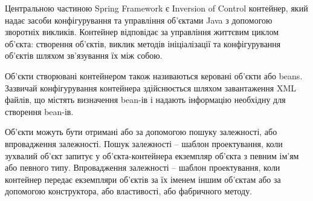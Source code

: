 \par Центральною частиною Spring Framework є Inversion of Control контейнер, який надає засоби конфігурування та управління об'єктами Java з допомогою зворотніх викликів. Контейнер відповідає за управління життєвим циклом об'єкта: створення об'єктів, виклик методів ініціалізації та конфігурування об'єктів шляхом зв'язування їх між собою.
\par Об'єкти створювані контейнером також називаються керовані об'єкти або beans. Зазвичай конфігурування контейнера здійснюється шляхом завантаження XML файлів, що містять визначення bean-ів і надають інформацію необхідну для створення bean-ів.
\par Об'єкти можуть бути отримані або за допомогою пошуку залежності, або впровадження залежності. Пошук залежності -- шаблон проектування, коли зухвалий об'єкт запитує у об'єкта-контейнера екземпляр об'єкта з певним ім'ям або певного типу. Впровадження залежності -- шаблон проектування, коли контейнер передає екземпляри об'єктів за їх іменем іншим об'єктам або за допомогою конструктора, або властивості, або фабричного методу.


